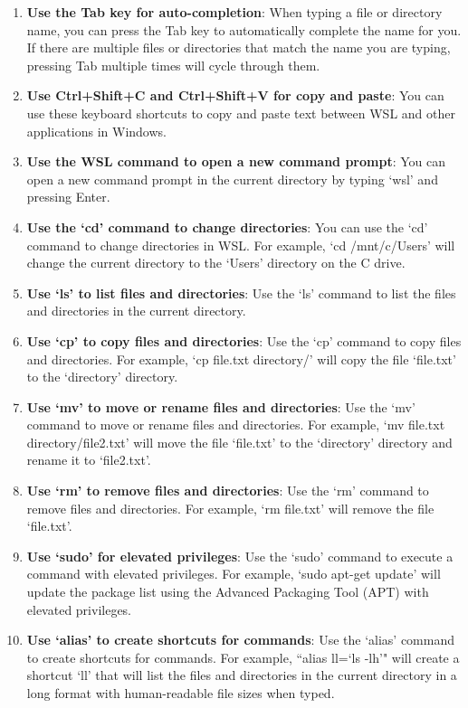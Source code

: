 \documentclass[10pt, a4paper]{article}
\begin{document}
\begin{enumerate}
    \item \textbf{Use the Tab key for auto-completion}: When typing a file or directory name, you can press the Tab key to automatically complete the name for you. If there are multiple files or directories that match the name you are typing, pressing Tab multiple times will cycle through them.
    \item \textbf{Use Ctrl+Shift+C and Ctrl+Shift+V for copy and paste}: You can use these keyboard shortcuts to copy and paste text between WSL and other applications in Windows.
    \item \textbf{Use the WSL command to open a new command prompt}: You can open a new command prompt in the current directory by typing `wsl' and pressing Enter.
    \item \textbf{Use the `cd' command to change directories}: You can use the `cd' command to change directories in WSL. For example, `cd /mnt/c/Users' will change the current directory to the `Users' directory on the C drive.
    \item \textbf{Use `ls' to list files and directories}: Use the `ls' command to list the files and directories in the current directory.
    \item \textbf{Use `cp' to copy files and directories}: Use the `cp' command to copy files and directories. For example, `cp file.txt directory/' will copy the file `file.txt' to the `directory' directory.
    \item \textbf{Use `mv' to move or rename files and directories}: Use the `mv' command to move or rename files and directories. For example, `mv file.txt directory/file2.txt' will move the file `file.txt' to the `directory' directory and rename it to `file2.txt'.
    \item \textbf{Use `rm' to remove files and directories}: Use the `rm' command to remove files and directories. For example, `rm file.txt' will remove the file `file.txt'.
    \item \textbf{Use `sudo' for elevated privileges}: Use the `sudo' command to execute a command with elevated privileges. For example, `sudo apt-get update' will update the package list using the Advanced Packaging Tool (APT) with elevated privileges.
    \item \textbf{Use `alias' to create shortcuts for commands}: Use the `alias' command to create shortcuts for commands. For example, ``alias ll=`ls -lh'" will create a shortcut `ll' that will list the files and directories in the current directory in a long format with human-readable file sizes when typed.
\end{enumerate}
\newpage
\end{document}
